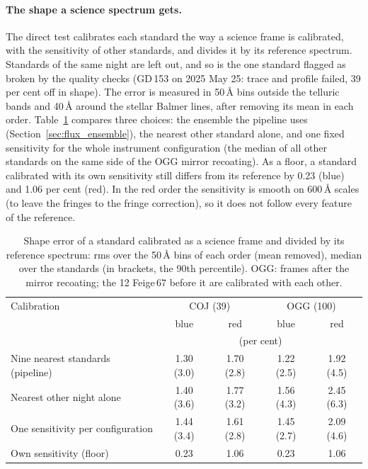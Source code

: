 \paragraph{The shape a science spectrum gets.} The direct test calibrates each standard the way a science frame is
calibrated, with the sensitivity of other standards, and divides it by its reference spectrum. Standards of the same
night are left out, and so is the one standard flagged as broken by the quality checks (GD\,153 on 2025 May 25: trace
and profile failed, 39 per cent off in shape). The error is measured in 50\,\AA{} bins outside the telluric bands and
40\,\AA{} around the stellar Balmer lines, after removing its mean in each order. Table~\ref{tab:shape} compares
three choices: the ensemble the pipeline uses (Section~\ref{sec:flux_ensemble}), the nearest other standard alone,
and one fixed sensitivity for the whole instrument configuration (the median of all other standards on the same side
of the OGG mirror recoating). As a floor, a standard calibrated with its own sensitivity still differs from its
reference by 0.23 (blue) and 1.06 per cent (red). In the red order the sensitivity is smooth on 600\,\AA{} scales
(to leave the fringes to the fringe correction), so it does not follow every feature of the reference.

\begin{table}[!htbp]
\centering\small
\caption{Shape error of a standard calibrated as a science frame and divided by its reference spectrum: rms over the
50\,\AA{} bins of each order (mean removed), median over the standards (in brackets, the 90th percentile).
OGG: frames after the mirror recoating; the 12 Feige\,67 before it are calibrated with each other.}
\label{tab:shape}
\begin{tabular}{lcccc}
\toprule
Calibration & \multicolumn{2}{c}{COJ (39)} & \multicolumn{2}{c}{OGG (100)} \\
 & blue & red & blue & red \\
 & \multicolumn{4}{c}{(per cent)} \\
\midrule
Nine nearest standards (pipeline) & 1.30 (3.0) & 1.70 (2.8) & 1.22 (2.5) & 1.92 (4.5) \\
Nearest other night alone & 1.40 (3.6) & 1.77 (3.2) & 1.56 (4.3) & 2.45 (6.3) \\
One sensitivity per configuration & 1.44 (3.4) & 1.61 (2.8) & 1.45 (2.7) & 2.09 (4.6) \\
Own sensitivity (floor) & 0.23 & 1.06 & 0.23 & 1.06 \\
\bottomrule
\end{tabular}
\end{table}

